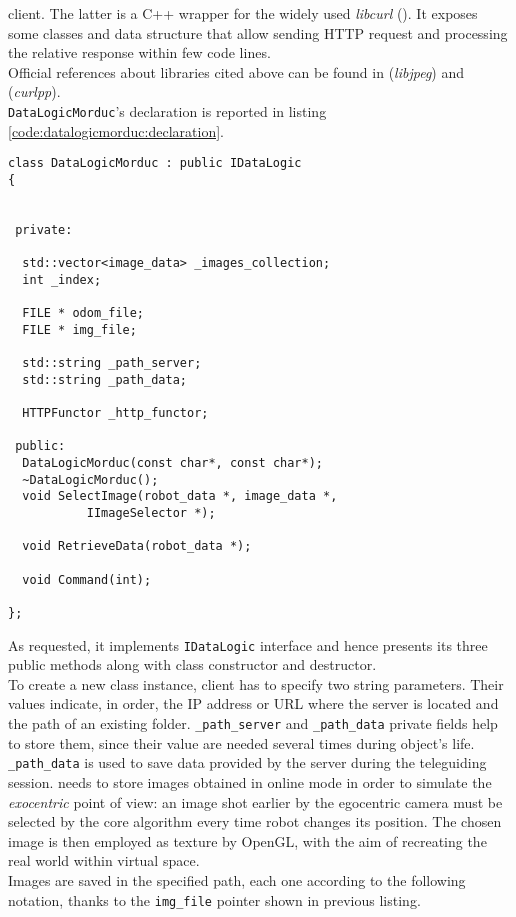 client.
The latter is a C++ wrapper for the widely used
\textit{libcurl} (\cite{library:libcurl}). It exposes some
classes and data structure
that allow sending HTTP request and processing the relative
response within few code lines.
\\
Official references about libraries cited above can be
found in \cite{library:libjpeg} (\textit{libjpeg}) and
\cite{library:curlpp} (\textit{curlpp}).
\\
\texttt{DataLogicMorduc}'s declaration is reported in
listing \ref{code:datalogicmorduc:declaration}.
\\
\begin{lstlisting}[caption={\texttt{DataLogicLogMorduc} declaration},
    label={code:datalogicmorduc:declaration}]
class DataLogicMorduc : public IDataLogic
{
  

 private:

  std::vector<image_data> _images_collection;
  int _index;
  
  FILE * odom_file;
  FILE * img_file;

  std::string _path_server;
  std::string _path_data;

  HTTPFunctor _http_functor;
  
 public:
  DataLogicMorduc(const char*, const char*);
  ~DataLogicMorduc();
  void SelectImage(robot_data *, image_data *,
		   IImageSelector *);

  void RetrieveData(robot_data *);

  void Command(int);

};
\end{lstlisting}

As requested, it implements \texttt{IDataLogic} interface and
hence presents its three public methods along with class constructor
and destructor.
\\
To create a new class instance, client has to specify
two string parameters. Their values indicate, in order, the IP
address or URL where the server is located and the path of an
existing folder. \texttt{\_path\_server} and \texttt{\_path\_data}
private fields help to store them, since their value are needed
several times during object's life.
\\
\texttt{\_path\_data} is used to save data provided by the server during the
teleguiding session. \framework{} needs to store images obtained
in online mode in order to simulate the \textit{exocentric} point
of view: an image shot earlier by the egocentric camera must be
selected by the core algorithm every time robot changes its position.
The chosen image is then employed as texture by OpenGL, with the aim
of recreating the real world within virtual space.
\\
Images are saved in the specified path, each one according to the
following notation, thanks to the \texttt{img\_file} pointer
shown in previous listing.

